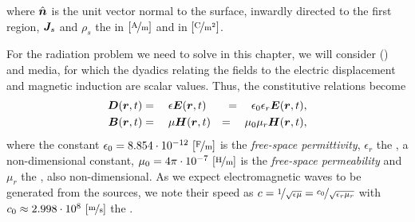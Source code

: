 where $\hat{\mbfit{n}}$ is the unit vector normal to the surface, inwardly directed to the first region, $\mbfit{J}_s$ and $\rho_s$ the  in $\mathrm{[\nicefrac{\mathrm{A}}{m}]}$ and  in $\mathrm{[\nicefrac{\mathrm{C}}{m^2}]}$. %

\par For the radiation problem we need to solve in this chapter, we will consider  () and  media, for which the dyadics relating the fields to the electric displacement and magnetic induction are scalar values. Thus, the constitutive relations become
\begin{eqnarray}
\mbfit{D}(\mbfit{r},t) &= \ \ \ \epsilon \mbfit{E}(\mbfit{r},t) &= \ \ \ \epsilon_0 \epsilon_r \mbfit{E}(\mbfit{r},t),  \label{eq:fsconst1}\\
\mbfit{B}(\mbfit{r},t) &= \ \ \ \mu \mbfit{H}(\mbfit{r},t)  &= \ \ \ \mu_0 \mu_r \mbfit{H}(\mbfit{r},t), \label{eq:fsconst2}
\end{eqnarray}
where the constant $\epsilon_0 = 8.854 \cdot 10^{-12} \ \mrm{[\nicefrac{\mrm F}{m}]}$ is the \textit{free-space permittivity}, $\epsilon_r$ the , a non-dimensional constant, $\mu_0 = 4\pi \cdot 10^{-7} \ \mathrm{[\nicefrac{\mathrm{H}}{m}]}$ is the \textit{free-space permeability} and $\mu_r$ the , also non-dimensional. As we expect electromagnetic waves to be generated from the sources, we note their speed as  $c = \nicefrac{1}{\sqrt{\epsilon \mu}} = \nicefrac{c_0}{\sqrt{\epsilon_r \mu_r}}$ with $c_0  \approx 2.998 \cdot 10^{8} \ \mrm{[\nicefrac{\mrm m}{s}]}$ the .

